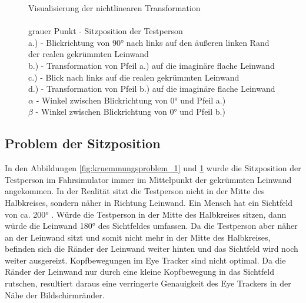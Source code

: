 \begin{figure}
\begin{center}
		\caption{Visualisierung der nichtlinearen Transformation\\\\
		\footnotesize grauer Punkt - Sitzposition der Testperson\\
		a.) - Blickrichtung von 90° nach links auf den äußeren linken Rand der realen gekrümmten Leinwand\\
		b.) - Transformation von Pfeil a.) auf die imaginäre flache Leinwand\\
		c.) - Blick nach links auf die realen gekrümmten Leinwand\\
		d.) - Transformation von Pfeil b.) auf die imaginäre flache Leinwand\\
		$\alpha$ - Winkel zwischen Blickrichtung von 0° und Pfeil a.)\\
		$\beta$ - Winkel zwischen Blickrichtung von 0° und Pfeil b.)} \label{fig:kruemmungsproblem_2}
	\end{center}
\end{figure}



\subsection{Problem der Sitzposition}

In den Abbildungen \ref{fig:kruemmungsproblem_1} und \ref{fig:kruemmungsproblem_2} wurde die Sitzposition der Testperson im Fahrsimulator immer im Mittelpunkt der gekrümmten Leinwand angekommen. In der Realität sitzt die Testperson nicht in der Mitte des Halbkreises, sondern näher in Richtung Leinwand. Ein Mensch hat ein Sichtfeld von ca. 200° \cite{lit_website_doccheck_fov}. Würde die Testperson in der Mitte des Halbkreises sitzen, dann würde die Leinwand 180° des Sichtfeldes umfassen. Da die Testperson aber näher an der Leinwand sitzt und somit nicht mehr in der Mitte des Halbkreises, befinden sich die Ränder der Leinwand weiter hinten und das Sichtfeld wird noch weiter ausgereizt. Kopfbewegungen im Eye Tracker sind nicht optimal. Da die Ränder der Leinwand nur durch eine kleine Kopfbewegung in das Sichtfeld rutschen, resultiert daraus eine verringerte Genauigkeit des Eye Trackers in der Nähe der Bildschirmränder.

